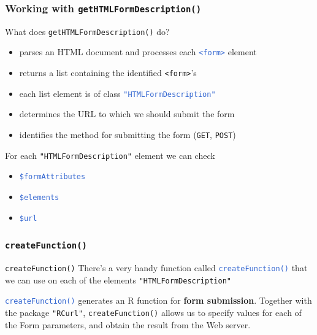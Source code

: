 \documentclass{beamer}\usepackage[]{graphicx}\usepackage[]{color}
\newcommand{\code}[1]{\texttt{#1}}
\newcommand{\highcode}[1]{\textcolor{highlight}{\texttt{#1}}}
\begin{document}

\begin{frame}
\frametitle{Working with \code{getHTMLFormDescription()}}

\begin{block}{What does \code{getHTMLFormDescription()} do?}
\begin{itemize}
 \item parses an HTML document and processes each \highcode{<form>} element
 \item returns a list containing the identified \code{<form>}'s
 \item each list element is of class \highcode{"HTMLFormDescription"}
 \item determines the URL to which we should submit the form
 \item identifies the method for submitting the form (\code{GET}, \code{POST})
\end{itemize}
\end{block}

\begin{block}{For each \code{"HTMLFormDescription"} element we can check}
\begin{itemize}
 \item \highcode{\$formAttributes}
 \item \highcode{\$elements}
 \item \highcode{\$url}
\end{itemize}
\end{block}

\end{frame}


\begin{frame}
\frametitle{\code{createFunction()}}

\begin{block}{\code{createFunction()}}
There's a very handy function called \highcode{createFunction()} that we can use on each of the elements \code{"HTMLFormDescription"}

\bigskip

\highcode{createFunction()} generates an R function for \textbf{form submission}. Together with the package \code{"RCurl"}, \code{createFunction()} allows us to specify values for each of the Form parameters, and obtain the result from the Web server.
\end{block}

\end{frame}
\end{document}
